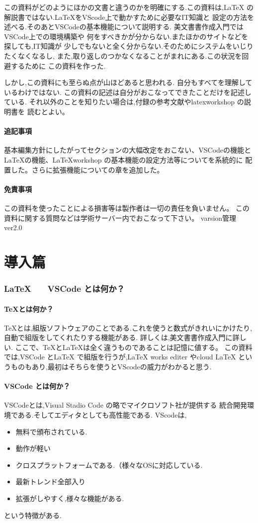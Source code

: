 \documentclass{ltjsarticle}
\begin{document}
この資料がどのようにほかの文書と違うのかを明確にする.この資料は,\LaTeX
の解説書ではない.\LaTeX をVScode上で動かすために必要なIT知識と
設定の方法を述べる.そのあとVSCodeの基本機能について説明する.
美文書書作成入門\cite{美文書本}ではVSCode上での環境構築や
何をすべきかが分からない.またほかのサイトなどを探しても,IT知識が
少しでもないと全く分からない.そのためにシステムをいじりたくなくなるし,
また,取り返しのつかなくなることがまれにある.この状況を回避するために
この資料を作った.

しかし,この資料にも至らぬ点が山ほどあると思われる.
自分もすべてを理解しているわけではない.
この資料の記述は自分がおこなってできたことだけを記述している.
それ以外のことを知りたい場合は,付録の参考文献やlatexworkshop の説明書を
読むとよい。

\subsection*{追記事項}
基本編集方針にしたがってセクションの大幅改定をおこない、VSCodeの機能と
LaTeXの機能、LaTeXworkshop の基本機能の設定方法等についてを系統的に
配置した。さらに拡張機能についての章を追加した。

\subsection*{免責事項}
この資料を使ったことによる損害等は製作者は一切の責任を負いません。
この資料に関する質問などは学術サーバー内でおこなって下さい。
varsion管理  ver2.0
\tableofcontents

\part{導入篇}
\section{\LaTeX　　VSCode とは何か？}
\subsection{\TeX とは何か？}
\TeX とは,組版ソフトウェアのことである.これを使うと数式がきれいにかけたり,
自動で組版をしてくれたりする機能がある.
詳しくは,美文書書作成入門\cite{美文書本}に詳しい.
ここで、\TeX と\LaTeX は全く違うものであることは記憶に値する。
この資料では,VSCode とLaTeX で組版を行うが,LaTeX works editer やcloud LaTeX 
というものもあり,最初はそちらを使うとVScodeの威力がわかると思う.
\subsection{VSCode とは何か？}
VSCodeとは,Visual Stadio Code の略でマイクロソフト社が提供する
統合開発環境である.そしてエディタとしても高性能である.
VScodeは,
\begin{itemize}
  \item 無料で頒布されている.
  \item 動作が軽い
  \item クロスプラットフォームである.（様々なOSに対応している.
  \item 最新トレンド全部入り
  \item 拡張がしやすく,様々な機能がある.
\end{itemize}
という特徴がある.
\end{document}
